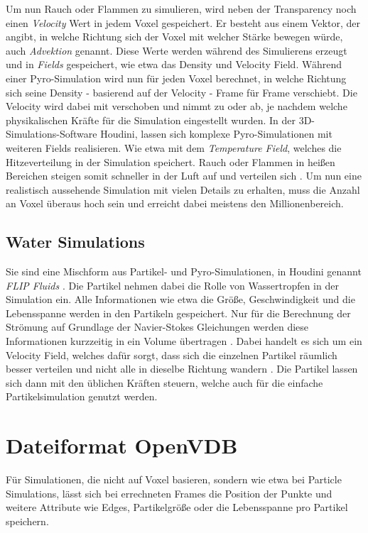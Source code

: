 Um nun Rauch oder Flammen zu simulieren, wird neben der Transparency noch einen \textit{Velocity} Wert in jedem Voxel gespeichert. Er besteht aus einem Vektor, der angibt, in welche Richtung sich der Voxel mit welcher Stärke bewegen würde, auch \textit{Advektion} genannt. Diese Werte werden während des Simulierens erzeugt und in \textit{Fields} gespeichert, wie etwa das Density und Velocity Field. Während einer Pyro-Simulation wird nun für jeden Voxel berechnet, in welche Richtung sich seine Density - basierend auf der Velocity - Frame für Frame verschiebt. Die Velocity wird dabei mit verschoben und nimmt zu oder ab, je nachdem welche physikalischen Kräfte für die Simulation eingestellt wurden. In der 3D-Simulations-Software Houdini, lassen sich komplexe Pyro-Simulationen mit weiteren Fields realisieren. Wie etwa mit dem \textit{Temperature Field}, welches die Hitzeverteilung in der Simulation speichert. Rauch oder Flammen in heißen Bereichen steigen somit schneller in der Luft auf und verteilen sich \parencite[]{understandinghowpyroworks}. Um nun eine realistisch aussehende Simulation mit vielen Details zu erhalten, muss die Anzahl an Voxel überaus hoch sein und erreicht dabei meistens den Millionenbereich.


\subsection{Water Simulations} 
Sie sind eine Mischform aus Partikel- und Pyro-Simulationen, in Houdini genannt \textit{FLIP Fluids} \parencite[]{flipsolver}. Die Partikel nehmen dabei die Rolle von Wassertropfen in der Simulation ein. Alle Informationen wie etwa die Größe, Geschwindigkeit und die Lebensspanne werden in den Partikeln gespeichert. Nur für die Berechnung der Strömung auf Grundlage der Navier-Stokes Gleichungen werden diese Informationen kurzzeitig in ein Volume übertragen \parencite[]{AlexandreJoelChorin.1967}. Dabei handelt es sich um ein Velocity Field, welches dafür sorgt, dass sich die einzelnen Partikel räumlich besser verteilen und nicht alle in dieselbe Richtung wandern \parencite[]{flipsolver}. Die Partikel lassen sich dann mit den üblichen Kräften steuern, welche auch für die einfache Partikelsimulation genutzt werden.

\section{Dateiformat OpenVDB}
Für Simulationen, die nicht auf Voxel basieren, sondern wie etwa bei Particle Simulations, lässt sich bei errechneten Frames die Position der Punkte und weitere Attribute wie Edges, Partikelgröße oder die Lebensspanne pro Partikel speichern. \\

